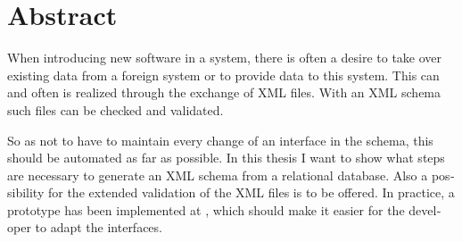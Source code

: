 \chapter{Abstract}

\begin{english} %
When introducing new software in a system, there is often a desire to take over existing data from a foreign system or to provide data to this system. This can and often is realized through the exchange of XML files. With an XML schema such files can be checked and validated.

So as not to have to maintain every change of an interface in the schema, this should be automated as far as possible. In this thesis I want to show what steps are necessary to generate an XML schema from a relational database.
Also a possibility for the extended validation of the XML files is to be offered.
In practice, a prototype has been implemented at \BMD, which should make it easier for the developer to adapt the interfaces.
\end{english}